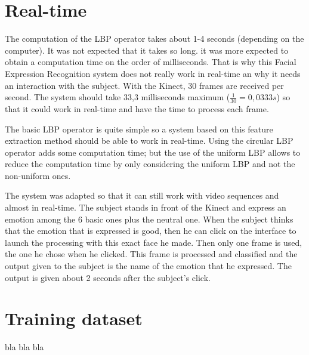 \section{Real-time}

\vspace{\baselineskip}
\noindent The computation of the LBP operator takes about 1-4 seconds (depending on the computer). It was not expected that it takes so long. it was more expected to obtain a computation time on the order of milliseconds. That is why this Facial Expression Recognition system does not really work in real-time an why it needs an interaction with the subject. With the Kinect, 30 frames are received per second. The system should take 33,3 milliseconds maximum ($ \frac{1}{30} = 0,0333 s $) so that it could work in real-time and have the time to process each frame. 
\newline

\noindent The basic LBP operator is quite simple so a system based on this feature extraction method should be able to work in real-time. Using the circular LBP operator adds some computation time; but the use of the uniform LBP allows to reduce the computation time by only considering the uniform LBP and not the non-uniform ones.
\newline

\noindent The system was adapted so that it can still work with video sequences and almost in real-time. The subject stands in front of the Kinect and express an emotion among the 6 basic ones plus the neutral one. When the subject thinks that the emotion that is expressed is good, then he can click on the interface to launch the processing with this exact face he made. Then only one frame is used, the one he chose when he clicked. This frame is processed and classified and the output given to the subject is the name of the emotion that he expressed. The output is given about 2 seconds after the subject's click.
\newline

\section{Training dataset}

\vspace{\baselineskip}

\noindent bla bla bla
\newline